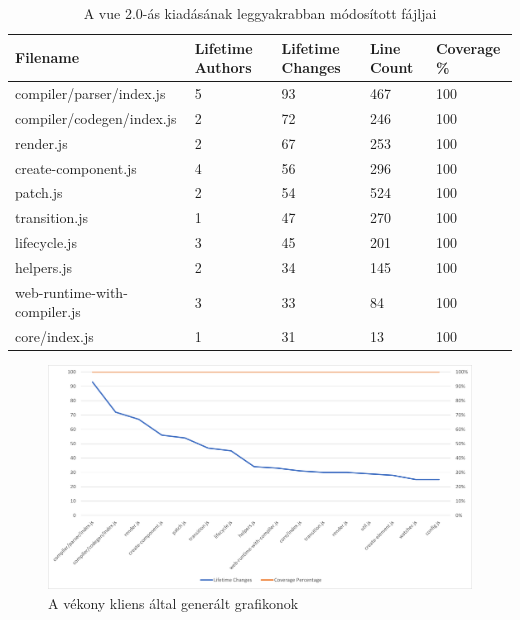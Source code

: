 \begin{table}[h]
    \hspace*{-1cm}\begin{tabular}{l|l|l|l|l}
        Filename                     & Lifetime Authors & Lifetime Changes & Line Count & Coverage \% \\ \hline
        compiler/parser/index.js     & 5                & 93               & 467        & 100         \\
        compiler/codegen/index.js    & 2                & 72               & 246        & 100         \\
        render.js                    & 2                & 67               & 253        & 100         \\
        create-component.js          & 4                & 56               & 296        & 100         \\
        patch.js                     & 2                & 54               & 524        & 100         \\
        transition.js                & 1                & 47               & 270        & 100         \\
        lifecycle.js                 & 3                & 45               & 201        & 100         \\
        helpers.js                   & 2                & 34               & 145        & 100         \\
        web-runtime-with-compiler.js & 3                & 33               & 84         & 100         \\
        core/index.js                & 1                & 31               & 13         & 100
    \end{tabular}
    \caption{A vue 2.0-ás kiadásának leggyakrabban módosított fájljai} \label{table:vue2-top-files}
\end{table}

\begin{figure}[H]
    \centering
    \includegraphics[width=1\textwidth]{images/vue/vue2-lifetime-changes.png}
    \caption{A vékony kliens által generált grafikonok}
    \label{fig:hestia-charts}
\end{figure}

